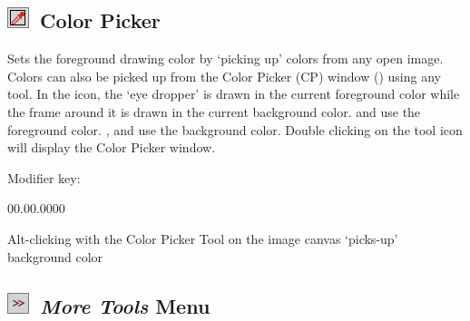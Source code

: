 

\subsection[Color Picker Tool]{\noindent \textsf{\protect\includegraphics[bb=0bp 5bp 20bp 20bp,scale=0.6]{images/tools/ColorPicker}}~Color
Picker\label{sec:Color-Picker}}

Sets the foreground drawing color by `picking up' colors from any
open image. Colors can also be picked up from the Color Picker (CP)
window (\textsf{})
using any tool. In the icon, the `eye dropper' is drawn in the current
foreground color while the frame around it
is drawn in the current background color.
 and
\textsf{}
use the foreground color. \textsf{},
 and\textsf{ }
use the background color. Double clicking on the tool icon will display
the Color Picker window. 

Modifier key:
\begin{lyxlist}{00.00.0000}
\item [{\mykeystroke{Alt}}] \noindent Alt-clicking with the Color Picker
Tool on the image canvas `picks-up' background color 
\end{lyxlist}



\subsection[\emph{More Tools} Menu]{\noindent \textsf{\protect\includegraphics[bb=0bp 5bp 20bp 20bp,scale=0.6]{images/tools/Switcher}}~\emph{More
Tools} Menu\label{sec:ToolSwitcher}\improvement{}\change{}}

